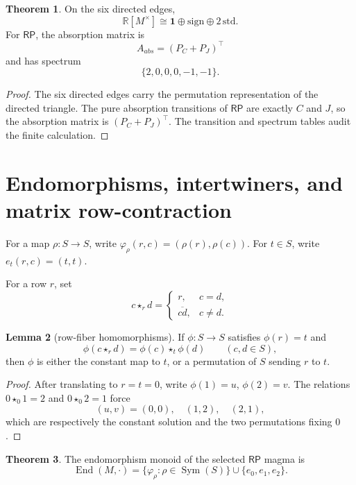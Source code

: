 \documentclass[11pt]{article}
\theoremstyle{definition}
\newtheorem{theorem}{Theorem}[section]
\newtheorem{lemma}[theorem]{Lemma}
\newcommand{\RP}{\mathsf{RP}}
\begin{document}
\begin{theorem}
\label{thm:15.4}
On the six directed edges,
\[
\mathbb R[M^\times]\cong\mathbf1\oplus\mathrm{sign}\oplus2\,\mathrm{std}.
\]
For \(\RP\), the absorption matrix is
\[
A_{abs}=(P_C+P_J)^\top
\]
and has spectrum
\[
\{2,0,0,0,-1,-1\}.
\]
\end{theorem}

\begin{proof}
The six directed edges carry the permutation representation of the
directed triangle.  The pure absorption transitions of \(\RP\) are exactly
\(C\) and \(J\), so the absorption matrix is \((P_C+P_J)^\top\).  The
transition and spectrum tables audit the finite calculation.
\end{proof}

\section{Endomorphisms, intertwiners, and matrix row-contraction}\label{endomorphisms-intertwiners-and-row-contraction}

For a map \(\rho:S\to S\), write
\(\varphi_\rho(r,c)=(\rho(r),\rho(c))\).  For \(t\in S\), write
\(e_t(r,c)=(t,t)\).

For a row \(r\), set
\[
c\star_r d=
\begin{cases}
r, & c=d,\\
\overline{cd}, & c\ne d.
\end{cases}
\]

\begin{lemma}[row-fiber homomorphisms]
\label{lem:16.1}
If \(\phi:S\to S\) satisfies \(\phi(r)=t\) and
\[
\phi(c\star_r d)=\phi(c)\star_t\phi(d)
\qquad(c,d\in S),
\]
then \(\phi\) is either the constant map to \(t\), or a permutation of
\(S\) sending \(r\) to \(t\).
\end{lemma}

\begin{proof}
After translating to \(r=t=0\), write \(\phi(1)=u\), \(\phi(2)=v\).  The
relations \(0\star_0 1=2\) and \(0\star_0 2=1\) force
\[
(u,v)=(0,0),\quad (1,2),\quad (2,1),
\]
which are respectively the constant solution and the two permutations
fixing \(0\).
\end{proof}

\begin{theorem}
\label{thm:16.2}
The endomorphism monoid of the selected \(\RP\) magma is
\[
\operatorname{End}(M,\cdot)
=
\{\varphi_\rho:\rho\in\operatorname{Sym}(S)\}\cup\{e_0,e_1,e_2\}.
\]
\end{theorem}
\end{document}
